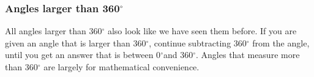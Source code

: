     \addtocounter{footnote}{-0}
    
\label{m39370*secfhsst!!!underscore!!!id210}
            \subsubsection{  Angles larger than 360${}^{\circ }$ }
            \nopagebreak
            
        \label{m39370*id314877}All angles larger than 360\begin{math}{}^{\circ }\end{math} also look like we have seen them before. If you are given an angle that is larger than 360\begin{math}{}^{\circ }\end{math}, continue subtracting 360\begin{math}{}^{\circ }\end{math} from the angle, until you get an answer that is between 0\begin{math}{}^{\circ }\end{math}and 360\begin{math}{}^{\circ }\end{math}. Angles that measure more than 360\begin{math}{}^{\circ }\end{math} are largely for mathematical convenience. \par 

